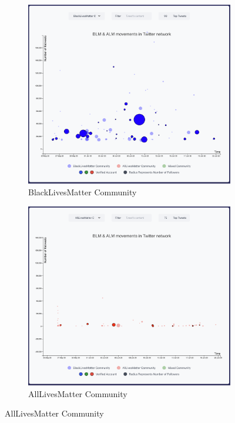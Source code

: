 \begin{figure}[H]
\begin{subfigure}{.45\textwidth}
  \centering
  \captionsetup{justification=centering}
  \includegraphics[width=0.9\linewidth]{./pics/eblm.png}  
  \caption{BlackLivesMatter Community}
  \label{fig:sub-first-blmc}
\end{subfigure}
\begin{subfigure}{.45\textwidth}
  \centering
  \captionsetup{justification=centering}
  \includegraphics[width=0.9\linewidth]{./pics/ealm.png}  
  \caption{AllLivesMatter Community}

\end{subfigure}
\end{figure}
